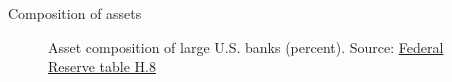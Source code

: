 \begin{frame}{Composition of assets}

\begin{figure}
\begin{center}


\caption{\label{fig:L4_Asset_composition_large_banks} Asset composition of large U.S. banks (percent). Source: \href{https://www.federalreserve.gov/releases/h8/current/default.htm}{Federal Reserve table H.8}}

\end{center}
\end{figure}

\end{frame}



